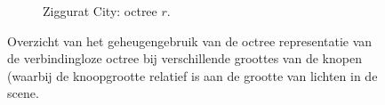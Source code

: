 \begin{figure}[p]
\begin{adjustbox}{minipage=\textwidth, scale=0.6}
\begin{subfigure}[b]{0.7\textwidth}
    \end{subfigure}
  \end{adjustbox} %
  \begin{adjustbox}{minipage=\textwidth, scale=0.6}
    \begin{subfigure}[b]{0.7\textwidth}
      \centering
      \def\svgwidth{\textwidth}
      
      \caption{Ziggurat City: octree $r$.}
      \label{fig:hs-nodesize-memory::zc-or}
    \end{subfigure}
  \end{adjustbox} %
  \caption{Overzicht van het geheugengebruik van de octree representatie van de
           verbindingloze octree bij verschillende groottes van de knopen (waarbij
           de knoopgrootte relatief is aan de grootte van lichten in de scene.}
\end{figure}%

